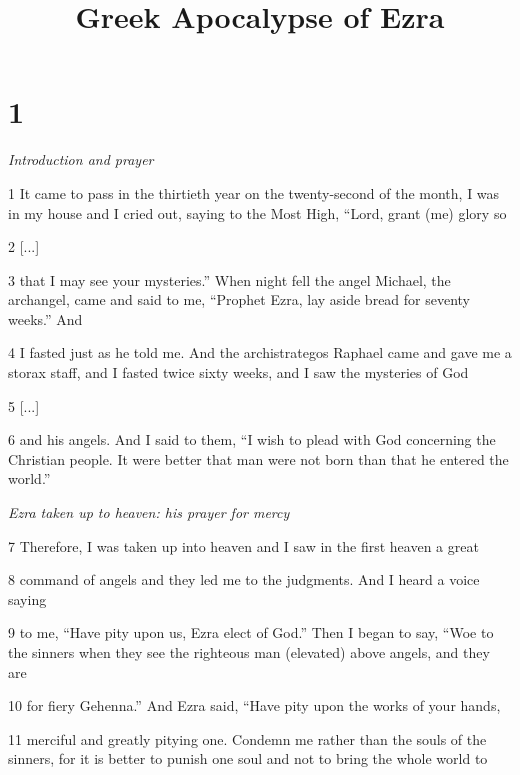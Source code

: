 

\title{Greek Apocalypse of Ezra}

\chapter{1}

\par \textit{Introduction and prayer}

\par 1 It came to pass in the thirtieth year on the twenty-second of the month, I was in my house and I cried out, saying to the Most High, “Lord, grant (me) glory so

\par 2 [...]


\par 3 that I may see your mysteries.” When night fell the angel Michael, the archangel, came and said to me, “Prophet Ezra, lay aside bread for seventy weeks.” And

\par 4 I fasted just as he told me. And the archistrategos Raphael came and gave me a storax staff, and I fasted twice sixty weeks, and I saw the mysteries of God

\par 5 [...]

\par 6 and his angels. And I said to them, “I wish to plead with God concerning the Christian people. It were better that man were not born than that he entered the world.”

\par \textit{Ezra taken up to heaven: his prayer for mercy}

\par 7 Therefore, I was taken up into heaven and I saw in the first heaven a great

\par 8 command of angels and they led me to the judgments. And I heard a voice saying

\par 9 to me, “Have pity upon us, Ezra elect of God.” Then I began to say, “Woe to the sinners when they see the righteous man (elevated) above angels, and they are

\par 10 for fiery Gehenna.” And Ezra said, “Have pity upon the works of your hands,

\par 11 merciful and greatly pitying one. Condemn me rather than the souls of the sinners, for it is better to punish one soul and not to bring the whole world to

